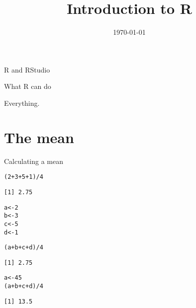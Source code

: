 \documentclass[10pt]{beamer}\usepackage[]{graphicx}\usepackage[]{color}
\title[\textbf{Intro to R}]{Introduction to R}
\date{\today}
\makeatletter
\newcommand{\hlnum}[1]{\textcolor[rgb]{0.686,0.059,0.569}{#1}}%
\newcommand{\hlopt}[1]{\textcolor[rgb]{0,0,0}{#1}}%
\newcommand{\hlstd}[1]{\textcolor[rgb]{0.345,0.345,0.345}{#1}}%
\newcommand{\hlkwb}[1]{\textcolor[rgb]{0.69,0.353,0.396}{#1}}%
\newenvironment{kframe}{%
 \def\at@end@of@kframe{}%
 \ifinner\ifhmode%
  \def\at@end@of@kframe{\end{minipage}}%
  \begin{minipage}{\columnwidth}%
 \fi\fi%
 \def\FrameCommand##1{\hskip\@totalleftmargin \hskip-\fboxsep
 \colorbox{shadecolor}{##1}\hskip-\fboxsep
     \hskip-\linewidth \hskip-\@totalleftmargin \hskip\columnwidth}%
 \MakeFramed {\advance\hsize-\width
   \@totalleftmargin\z@ \linewidth\hsize
   \@setminipage}}%
 {\par\unskip\endMakeFramed%
 \at@end@of@kframe}
\newenvironment{knitrout}{}{} %
\makeatother
\begin{document}
\begin{frame}
\maketitle	
\end{frame}

\begin{frame}{R and RStudio}
  
\end{frame}

\begin{frame}{What R can do}

  \pause Everything.

\end{frame}


\section{The mean}

\begin{frame}[fragile]{Calculating a mean}

\begin{knitrout}
\color{fgcolor}\begin{kframe}
\begin{alltt}
  \hlstd{(}\hlnum{2} \hlopt{+} \hlnum{3} \hlopt{+} \hlnum{5} \hlopt{+} \hlnum{1}\hlstd{)} \hlopt{/} \hlnum{4}
\end{alltt}
\begin{verbatim}
[1] 2.75
\end{verbatim}
\end{kframe}
\end{knitrout}
\pause
\begin{knitrout}
\color{fgcolor}\begin{kframe}
\begin{alltt}
  \hlstd{a} \hlkwb{<-} \hlnum{2}
  \hlstd{b} \hlkwb{<-} \hlnum{3}
  \hlstd{c} \hlkwb{<-} \hlnum{5}
  \hlstd{d} \hlkwb{<-} \hlnum{1}

  \hlstd{(a} \hlopt{+} \hlstd{b} \hlopt{+} \hlstd{c} \hlopt{+} \hlstd{d)} \hlopt{/} \hlnum{4}
\end{alltt}
\begin{verbatim}
[1] 2.75
\end{verbatim}
\end{kframe}
\end{knitrout}
\pause
\begin{knitrout}
\color{fgcolor}\begin{kframe}
\begin{alltt}
  \hlstd{a} \hlkwb{<-} \hlnum{45}
  \hlstd{(a} \hlopt{+} \hlstd{b} \hlopt{+} \hlstd{c} \hlopt{+} \hlstd{d)} \hlopt{/} \hlnum{4}
\end{alltt}
\begin{verbatim}
[1] 13.5
\end{verbatim}
\end{kframe}
\end{knitrout}
\end{frame}
\end{document}

